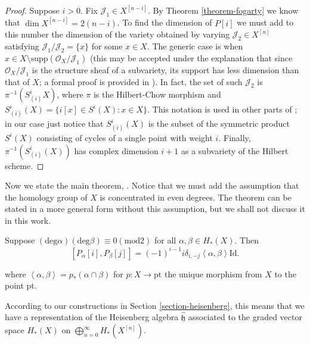 \begin{proof}
Suppose $i>0$.
Fix $\mathcal{J}_1 \in X^{[n-i]}$.
By Theorem \ref{theorem-fogarty} we know that
$\dim X^{[n-i]}=2(n-i)$.
To find the dimension of $P[i]$
we must add to this number the dimension of
the variety
obtained by varying  $\mathcal{J}_2 \in
X^{[n]}$
satisfying
$\mathcal{J}_1/\mathcal{J}_2=\{x\}$
for some $x \in X$.
The generic case is when
$x \in
X\setminus\text{supp}(\mathcal{O}_X/\mathcal{J}_1)$
(this may be accepted under the explanation
that since $\mathcal{O}_X/\mathcal{J}_1$ is
the structure sheaf
of a subvariety, its support has less
dimension than that of $X$;
a formal proof is provided in \cite[Lemma
8.31]{Nakajima-lectures}).
In fact, the set of such $\mathcal{J}_2$ is
$\pi^{-1}(S^i_{(i)}X)$, where $\pi$ is
the Hilbert-Chow morphism and
$S^i_{(i)}(X)=\{i[x] \in S^i(X):x \in X\}$.
This notation is used in other parts of
\cite{Nakajima-lectures};
in our case just notice that $S^i_{(i)}(X)$
is the subset of the symmetric product
$S^i(X)$
consisting of cycles of a single point with
weight $i$.
Finally, $\pi^{-1}(S^i_{(i)}(X))$ has
complex dimension $i+1$
as a subvariety of the Hilbert scheme.
\end{proof}

\medskip\noindent
Now we state the main theorem,
\cite[Theorem 8.13]{Nakajima-lectures}.
Notice that we must add the assumption that
the homology group of $X$ is concentrated in
even degrees.
The theorem can be stated in a more general
form without
this assumption, but we shall not discuss it
in this work.
\begin{theorem}
\label{theorem-main}
Suppose $(\text{deg}
\alpha)(\text{deg}\beta)\equiv 0 (\text{mod}
2)$
for all $\alpha,\beta \in H_*(X)$.
Then
\begin{equation}
\label{equation-main}
[P_\alpha[i],P_\beta[j]]=(-1)^{i-1}i
\delta_{i,-j}
\left\langle{}\alpha,\beta\right\rangle{}\text{Id}.
\end{equation}

\noindent
where $\left\langle{}\alpha,\beta\right\rangle{}=p_*(\alpha
\cap \beta)$
for $p:X \to \text{pt}$ the unique morphism
from $X$ to the point pt.
\end{theorem}

\medskip\noindent
According to our constructions in
Section \ref{section-heisenberg},
this means that we have a representation of
the Heisenberg algebra $\hat{\mathfrak{h}}$
associated to the graded vector space
$H_*(X)$
on $\bigoplus_{n=0}^{\infty}H_{*}(X^{[n]})$.


